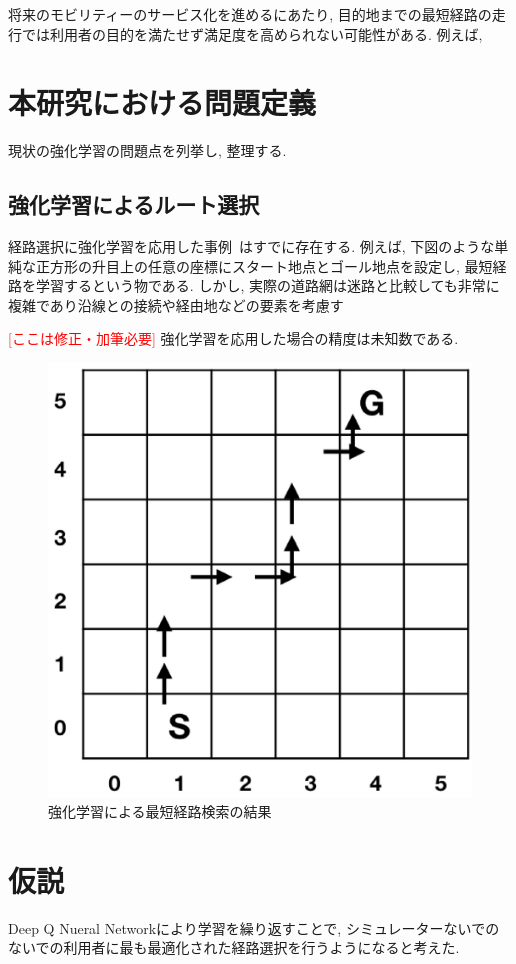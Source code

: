 将来のモビリティーのサービス化を進めるにあたり, 目的地までの最短経路の走行では利用者の目的を満たせず満足度を高められない可能性がある.
例えば, 

\section{本研究における問題定義}

現状の強化学習の問題点を列挙し, 整理する.

\subsection{強化学習によるルート選択}

経路選択に強化学習を応用した事例~\cite{DQNRouteSimple}はすでに存在する. 例えば, 下図のような単純な正方形の升目上の任意の座標にスタート地点とゴール地点を設定し, 最短経路を学習するという物である. 
しかし, 実際の道路網は迷路と比較しても非常に複雑であり沿線との接続や経由地などの要素を考慮す

\textcolor{red}{[ここは修正・加筆必要]}
強化学習を応用した場合の精度は未知数である.

\begin{figure}[H]
    \centering  %
    \includegraphics[clip,width = 13.0cm]{assets/rein_simple.eps}
    \caption{強化学習による最短経路検索の結果}  \label{sample}
\end{figure}
  





\section{仮説}

Deep Q Nueral Networkにより学習を繰り返すことで, シミュレーターないでのないでの利用者に最も最適化された経路選択を行うようになると考えた.



